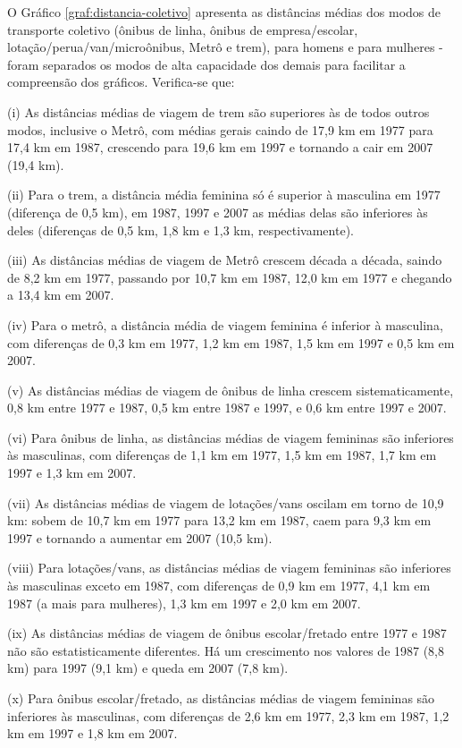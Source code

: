 \newpage

O Gráfico \ref{graf:distancia-coletivo} apresenta as distâncias médias dos modos de transporte coletivo (ônibus de linha, ônibus de empresa/escolar, lotação/perua/van/microônibus, Metrô e trem), para homens e para mulheres - foram separados os modos de alta capacidade dos demais para facilitar a compreensão dos gráficos. Verifica-se que:
\begin{compactitem}[]
\item (i) As distâncias médias de viagem de trem são superiores às de todos outros modos, inclusive o Metrô, com médias gerais caindo de 17,9 km em 1977 para 17,4 km em 1987, crescendo para 19,6 km em 1997 e tornando a cair em 2007 (19,4 km).
\item (ii) Para o trem, a distância média feminina só é superior à masculina em 1977 (diferença de 0,5 km), em 1987, 1997 e 2007 as médias delas são inferiores às deles (diferenças de 0,5 km, 1,8 km e 1,3 km, respectivamente).
\item (iii) As distâncias médias de viagem de Metrô crescem década a década, saindo de 8,2 km em 1977, passando por 10,7 km em 1987, 12,0 km em 1977 e chegando a 13,4 km em 2007.
\item (iv) Para o metrô, a distância média de viagem feminina é inferior à masculina, com diferenças de 0,3 km em 1977, 1,2 km em 1987, 1,5 km em 1997 e 0,5 km em 2007.
\item (v) As distâncias médias de viagem de ônibus de linha crescem sistematicamente, 0,8 km entre 1977 e 1987, 0,5 km entre 1987 e 1997, e 0,6 km entre 1997 e 2007.
\item (vi) Para ônibus de linha, as distâncias médias de viagem femininas são inferiores às masculinas, com diferenças de 1,1 km em 1977, 1,5 km em 1987, 1,7 km em 1997 e 1,3 km em 2007.
\item (vii) As distâncias médias de viagem de lotações/vans oscilam em torno de 10,9 km: sobem de 10,7 km em 1977 para 13,2 km em 1987, caem para 9,3 km em 1997 e tornando a aumentar em 2007 (10,5 km).
\item (viii) Para lotações/vans, as distâncias médias de viagem femininas são inferiores às masculinas exceto em 1987, com diferenças de 0,9 km em 1977, 4,1 km em 1987 (a mais para mulheres), 1,3 km em 1997 e 2,0 km em 2007.
\item (ix) As distâncias médias de viagem de ônibus escolar/fretado entre 1977 e 1987 não são estatisticamente diferentes. Há um crescimento nos valores de 1987 (8,8 km) para 1997 (9,1 km) e queda em 2007 (7,8 km).

\item (x) Para ônibus escolar/fretado, as distâncias médias de viagem femininas são inferiores às masculinas, com diferenças de 2,6 km em 1977, 2,3 km em 1987, 1,2 km em 1997 e 1,8 km em 2007.

\end{compactitem}

